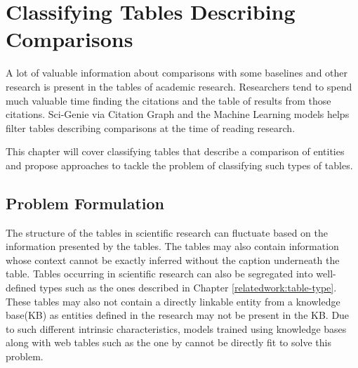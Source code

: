 \chapter{Classifying Tables Describing Comparisons}
\label{table_classification}
A lot of valuable information about comparisons with some baselines and other research is present in the tables of academic research. Researchers tend to spend much valuable time finding the citations and the table of results from those citations. Sci-Genie via Citation Graph and the Machine Learning models helps filter tables describing comparisons at the time of reading research. 

This chapter will cover classifying tables that describe a comparison of entities and propose approaches to tackle the problem of classifying such types of tables. 

\section{Problem Formulation}

The structure of the tables in scientific research can fluctuate based on the information presented by the tables. The tables may also contain information whose context cannot be exactly inferred without the caption underneath the table. Tables occurring in scientific research can also be segregated into well-defined types such as the ones described in Chapter \ref{relatedwork:table-type}. These tables may also not contain a directly linkable entity from a knowledge base(KB) as entities defined in the research may not be present in the KB. Due to such different intrinsic characteristics, models trained using knowledge bases along with web tables such as the one by \cite{deng2020turl} cannot be directly fit to solve this problem. 

